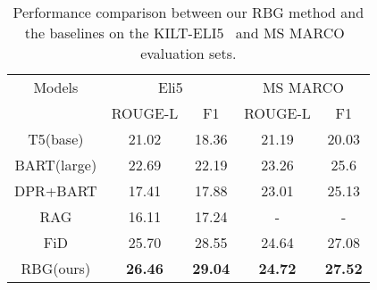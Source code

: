 \documentclass[11pt]{article}
\begin{document}
\begin{table}[!ht]
\resizebox{0.47\textwidth}{!}
{
\begin{tabular}{c|cc|cc}
\hline
Models  & \multicolumn{2}{c}{Eli5} &\multicolumn{2}{c}{MS MARCO}\\  
            & ROUGE-L      & F1         & ROUGE-L       & F1 \\ \hline
T5(base)    & 21.02        & 18.36       & 21.19 & 20.03 \\
BART(large) & 22.69        & 22.19      & 23.26 & 25.6  \\
DPR+BART    & 17.41        & 17.88      & 23.01 & 25.13     \\
RAG         & 16.11        & 17.24      &   -    & -  \\
FiD  &    25.70      &    28.55    &   24.64    & 27.08   \\
RBG(ours)   & \textbf{26.46}        & \textbf{29.04}      & \textbf{24.72} & \textbf{27.52} \\ \hline
\end{tabular}
}
\vspace{-5pt}
\caption{Performance comparison between our RBG method and the baselines on the KILT-ELI5~\cite{petroni2021kilt} and MS MARCO~\cite{nguyen2016ms} evaluation sets.}
\label{results}
\vspace{-18pt}
\end{table}
\end{document}
